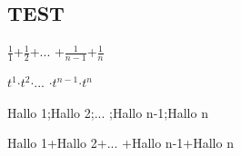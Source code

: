 

\subsection{TEST}
\newcommand{\continue}[2]{
\providecommand{\num}{1}\renewcommand{\num}{1}#2#1\renewcommand{\num}{2}#2#1\renewcommand{\num}{{...}}... #1\renewcommand{\num}{{n-1}}#2#1\renewcommand{\num}{{n}}#2
}

\continue{+}{$\frac{1}{\num}$}

\continue{$\cdot$}{$t^\num$}

\continue{;}{Hallo \num}

\continue{+}{Hallo \num}



